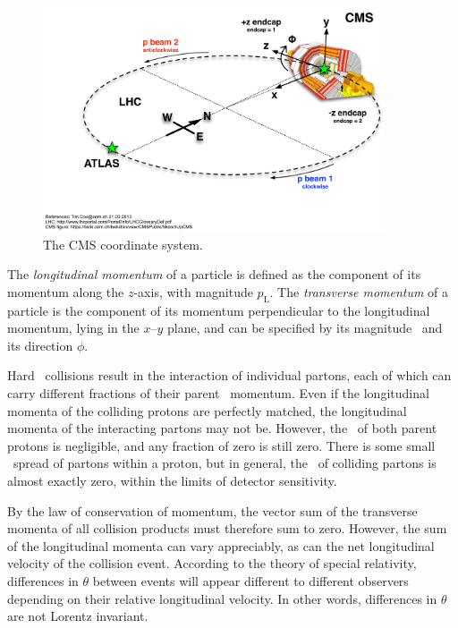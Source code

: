 \documentclass[oneside, letterpaper, 12pt, oldfontcommands]{memoir}
\begin{document}
\begin{figure}[hbtp]
  \begin{center}
    \includegraphics[width=0.90\textwidth]{Figures/cms_coordinates.pdf}
    \caption{
    The CMS coordinate system.
    }
    \label{fig:cms_coordinates}
  \end{center}
\end{figure}

The \textit{longitudinal momentum} of a particle is defined as the component of its momentum along the $z$-axis, with
magnitude $p_\mathrm{L}$. The \textit{transverse momentum} of a particle is the component of its momentum perpendicular
to the longitudinal momentum, lying in the $x$--$y$ plane,
and can be specified by its magnitude \pT\ and its direction $\phi$.

Hard \Pp\Pp\ collisions
result in the interaction of individual partons, each of which can carry different fractions of their
parent \Pp\ momentum. Even if the longitudinal momenta of the colliding protons are perfectly matched,
the longitudinal momenta of the interacting partons may not be. However, the \pT\ of
both parent protons is negligible, and any fraction of zero is still zero. There is some small
\pT\ spread of partons within a proton, but in general, the \pT\ of colliding partons is almost exactly zero, within the limits of detector sensitivity.

By the law of conservation of momentum, the vector sum of the
transverse momenta of all collision products must therefore sum to zero. However, the sum of the longitudinal momenta
can vary appreciably, as can the net longitudinal velocity of the collision event. According
to the theory of special relativity, differences in $\theta$ between events will appear different
to different observers depending on their relative longitudinal velocity. In other words, differences in $\theta$ are not Lorentz invariant.
\end{document}
